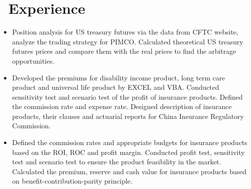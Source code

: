 \documentclass{resume}
\begin{document}
\section{\faGears\ Experience}
\large {}
\begin{itemize}\large
  \item Position analysis for US treasury futures via the data from CFTC website,  analyze the trading strategy for PIMCO. Calculated theoretical US treasury futures prices and compare them with the real prices to find the arbitrage opportunities.
\end{itemize}
\large {}
\begin{itemize}\large
  \item Developed the premiums for disability income product,  long term care product and universal life product by EXCEL and VBA. Conducted sensitivity test and scenario test of the profit of insurance products. Defined the commission rate and expense rate. Designed description of insurance products,  their clauses and actuarial reports for China Insurance Regulatory Commission.
  
  
\end{itemize}

\large {}
\begin{itemize}\large
  \item Defined the commission rates and appropriate budgets for insurance products based on the ROI,  ROC and profit margin. Conducted profit test,  sensitivity test and scenario test to ensure the product feasibility in the market. Calculated the premium,  reserve and cash value for insurance products based on benefit-contribution-parity principle.
    
\end{itemize}
\end{document}
